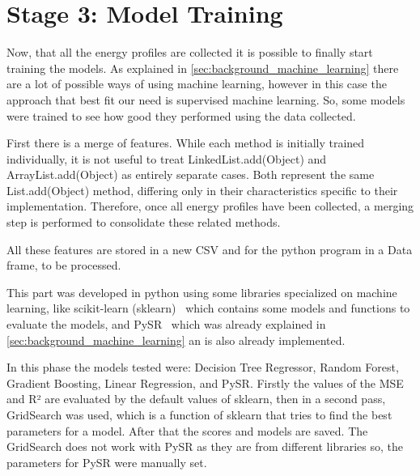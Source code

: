 \section{Stage 3: Model Training} \label{sec:work_stage3_model_training}

Now, that all the energy profiles are collected it is possible to finally start training the models. As explained in \ref{sec:background_machine_learning} there are a lot of possible ways of using machine learning, however in this case the approach that best fit our need is supervised machine learning. So, some models were trained to see how good they performed using the data collected.

First there is a merge of features. While each method is initially trained individually, it is not useful to treat LinkedList.add(Object) and ArrayList.add(Object) as entirely separate cases. Both represent the same List.add(Object) method, differing only in their characteristics specific to their implementation. Therefore, once all energy profiles have been collected, a merging step is performed to consolidate these related methods.

All these features are stored in a new CSV and for the python program in a Data frame, to be processed.

This part was developed in python using some libraries specialized on machine learning, like scikit-learn (sklearn)~\cite{scikit-learn} which contains some models and functions to evaluate the models, and PySR~\cite{cranmer2023interpretablemachinelearningscience} which was already explained in \ref{sec:background_machine_learning} an is also already implemented.

In this phase the models tested were: Decision Tree Regressor, Random Forest, Gradient Boosting, Linear Regression, and PySR. Firstly the values of the MSE and R² are evaluated by the default values of sklearn, then in a second pass, GridSearch was used, which is a function of sklearn that tries to find the best parameters for a model. After that the scores and models are saved. The GridSearch does not work with PySR as they are from different libraries so, the parameters for PySR were manually set.

